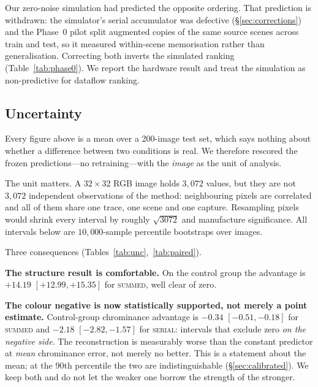\documentclass[10pt,conference]{article}
\begin{document}
Our zero-noise simulation had predicted the opposite ordering. That prediction is
withdrawn: the simulator's serial accumulator was defective (\S\ref{sec:corrections}) and
the Phase~0 pilot split augmented copies of the same source scenes across train and test,
so it measured within-scene memorisation rather than generalisation. Correcting both
inverts the simulated ranking (Table~\ref{tab:phase0}). We report the hardware result and
treat the simulation as non-predictive for dataflow ranking.

\subsection{Uncertainty}
\label{sec:unc}

Every figure above is a mean over a 200-image test set, which says nothing about whether
a difference between two conditions is real. We therefore rescored the frozen
predictions---no retraining---with the \emph{image} as the unit of analysis.

The unit matters. A $32\times32$ RGB image holds $3{,}072$ values, but they are not
$3{,}072$ independent observations of the method: neighbouring pixels are correlated and
all of them share one trace, one scene and one capture. Resampling pixels would shrink
every interval by roughly $\sqrt{3072}$ and manufacture significance. All intervals below
are $10{,}000$-sample percentile bootstraps over images.

\begin{table}[t]\centering\small
\caption{Advantage over the analytic prior with 95\% bootstrap CIs over images.}
\label{tab:unc}

\end{table}

\begin{table}[t]\centering\small
\caption{Paired per-image differences between dataflows. The split seed is shared, so
the test sets match and the comparison is paired; this is checked, not assumed. Pairing
removes between-image variance, which dominates here because some images are far easier
than others.}
\label{tab:paired}

\end{table}

Three consequences (Tables~\ref{tab:unc},~\ref{tab:paired}).

\textbf{The structure result is comfortable.} On the control group the advantage is
$+14.19$ $[+12.99, +15.35]$ for \textsc{summed}, well clear of zero.

\textbf{The colour negative is now statistically supported, not merely a point
estimate.} Control-group chrominance advantage is $-0.34$ $[-0.51, -0.18]$ for
\textsc{summed} and $-2.18$ $[-2.82, -1.57]$ for \textsc{serial}: intervals that exclude
zero \emph{on the negative side}. The reconstruction is measurably worse than the
constant predictor at \emph{mean}
chrominance error, not merely no better. This is a statement about the mean; at the
$90$th percentile the two are indistinguishable (\S\ref{sec:calibrated}). We keep both
and do not let the weaker one borrow the strength of the stronger.
\end{document}
